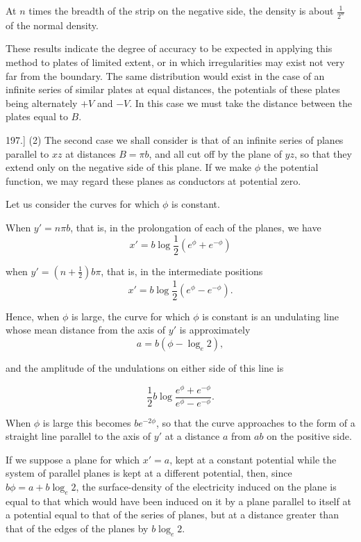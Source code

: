 \documentclass[11pt,a4paper]{article}
\begin{document}
At $n$ times the breadth of the strip on the negative side, the density
is about $\frac{1}{2^n}$ of the normal density.

These results indicate the degree of accuracy to be expected in
applying this method to plates of limited extent, or in which
irregularities may exist not very far from the boundary. The same
distribution would exist in the case of an infinite series of similar
plates at equal distances, the potentials of these plates being
alternately $+V$ and $-V$. In this case we must take the distance
between the plates equal to $B$.

197.] (2) The second case we shall consider is that of an infinite
series of planes parallel to $xz$ at distances $B=\pi b$, and all cut
off by the plane of $yz$, so that they extend only on the negative side
of this plane. If we make $\phi$ the potential function, we may regard
these planes as conductors at potential zero.

Let us consider the curves for which  $\phi$  is constant.

When $y'=n\pi b$, that is, in the prolongation of each of the planes,
we have
\begin{equation}\tag{21}
x'=b\log\frac{1}{2}\left(e^\phi+e^{-\phi}\right)
\end{equation}

when $y'=(n+\frac{1}{2})b\pi$, that is, in the intermediate positions
\begin{equation}\tag{22}
x'=b\log\frac{1}{2}\left(e^\phi-e^{-\phi}\right).
\end{equation}

Hence, when $\phi$ is large, the curve for which $\phi$ is constant is
an undulating line whose mean distance from the axis of $y'$ is
approximately
\begin{equation}\tag{23}
a=b(\phi-\log_e 2),
\end{equation}

and the amplitude of the undulations on either side of this line is

\begin{equation}\tag{24}
\frac{1}{2}b\log\frac{e^\phi+e^{-\phi}}{e^\phi-e^{-\phi}}.
\end{equation}

When $\phi$ is large this becomes $be^{-2\phi}$, so that the curve
approaches to the form of a straight line parallel to the axis of $y'$
at a distance $a$ from $ab$ on the positive side.

If we suppose a plane for which $x'=a$, kept at a constant potential
while the system of parallel planes is kept at a different potential,
then, since $b\phi=a+b\log_e 2$, the surface-density of the electricity
induced on the plane is equal to that which would have been induced on
it by a plane parallel to itself at a potential equal to that of the
series of planes, but at a distance greater than that of the edges of
the planes by $b\log_e 2$.
\end{document}
